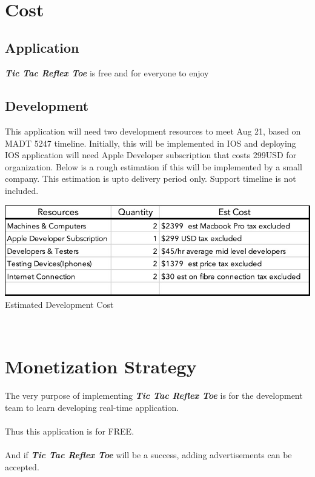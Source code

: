 \documentclass{scrartcl}
\begin{document}
~\newline
\section{Cost}
    \subsection{Application}
        \textbf{\emph{Tic Tac Reflex Toe}} is free and for everyone to enjoy
    \subsection{Development} 
        This application will need two development resources to meet Aug 21, based on MADT 5247 timeline.  Initially, this will be implemented in IOS and deploying IOS application will need Apple Developer subscription that costs 299USD for organization.  Below is a rough estimation if this will be implemented by a small company. This estimation is upto delivery period only.  Support timeline is not included.
        \begin{center}
        \includegraphics[width=6in]{images/Cost.jpg}\\
        \caption{Estimated Development Cost}
        \end{center}
~\newline
\section{Monetization Strategy}
The very purpose of implementing \textbf{\emph{Tic Tac Reflex Toe}} is for the development team to learn developing real-time application.\\\\Thus this application is for FREE.\\\\And if \textbf{\emph{Tic Tac Reflex Toe}} will be a success, adding advertisements can be accepted.

~\newline
\end{document}
